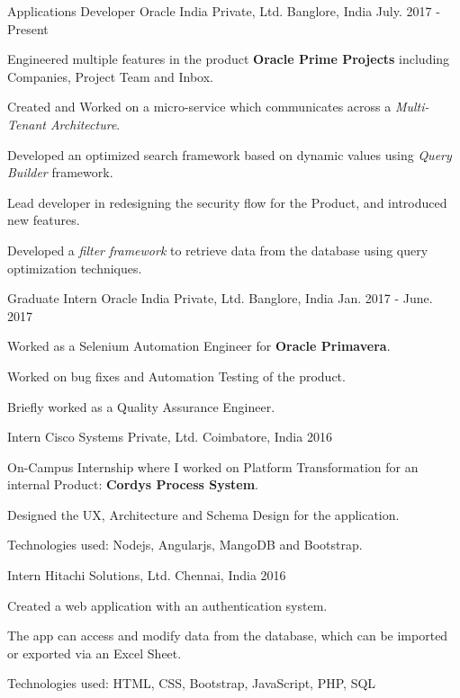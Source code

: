 \begin{cventries}
  \cventry
    {Applications Developer}
    {Oracle India Private, Ltd.}
    {Banglore, India}
    {July. 2017 - Present}
    {
      \begin{cvitems}
        \item {Engineered multiple features in the product \textbf{Oracle Prime Projects} including Companies, Project Team and Inbox.}
        \item {Created and Worked on a micro-service which communicates across a \textit{Multi-Tenant Architecture}.}
        \item {Developed an optimized search framework based on dynamic values using \textit{Query Builder} framework.}
        \item {Lead developer in redesigning the security flow for the Product, and introduced new features.}
        \item {Developed a \textit{filter framework} to retrieve data from the database using query optimization techniques.}
      \end{cvitems}
    }
  \cventry
    {Graduate Intern}
    {Oracle India Private, Ltd.}
    {Banglore, India}
    {Jan. 2017 - June. 2017}
    {
      \begin{cvitems}
        \item {Worked as a Selenium Automation Engineer for \textbf{Oracle Primavera}.}
        \item {Worked on bug fixes and Automation Testing of the product.}
        \item {Briefly worked as a Quality Assurance Engineer.}
      \end{cvitems}
    }
  \cventry
    {Intern}
    {Cisco Systems Private, Ltd.}
    {Coimbatore, India}
    {2016}
    {
      \begin{cvitems}
        \item {On-Campus Internship where I worked on Platform Transformation for an internal Product: \textbf{Cordys Process System}.}
        \item {Designed the UX, Architecture and Schema Design for the application.}
        \item {Technologies used: Nodejs, Angularjs, MangoDB and Bootstrap.}
      \end{cvitems} 
    }
  \cventry
    {Intern}
    {Hitachi Solutions, Ltd.}
    {Chennai, India}
    {2016}
    {
      \begin{cvitems}
        \item {Created a web application with an authentication system.}
        \item {The app can access and modify data from the database, which can be imported or exported via an Excel Sheet.}
        \item {Technologies used: HTML, CSS, Bootstrap, JavaScript, PHP, SQL }
      \end{cvitems}
    }
\end{cventries}